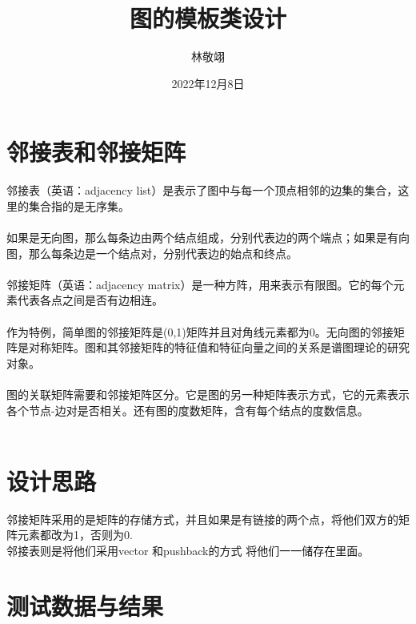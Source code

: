 \documentclass{article}
\title{图的模板类设计}
\author{林敬翊}
\date{2022年12月8日}
\begin{document}
\maketitle

\section{邻接表和邻接矩阵}
邻接表（英语：adjacency list）是表示了图中与每一个顶点相邻的边集的集合，这里的集合指的是无序集。\\
~\\
如果是无向图，那么每条边由两个结点组成，分别代表边的两个端点；如果是有向图，那么每条边是一个结点对，分别代表边的始点和终点。\\
~\\
\hspace*{0.7cm}邻接矩阵（英语：adjacency matrix）是一种方阵，用来表示有限图。它的每个元素代表各点之间是否有边相连。\\
~\\
作为特例，简单图的邻接矩阵是(0,1)矩阵并且对角线元素都为0。无向图的邻接矩阵是对称矩阵。图和其邻接矩阵的特征值和特征向量之间的关系是谱图理论的研究对象。\\
~\\
图的关联矩阵需要和邻接矩阵区分。它是图的另一种矩阵表示方式，它的元素表示各个节点-边对是否相关。还有图的度数矩阵，含有每个结点的度数信息。\\
~\\

\section{设计思路}
邻接矩阵采用的是矩阵的存储方式，并且如果是有链接的两个点，将他们双方的矩阵元素都改为1，否则为0.\\

邻接表则是将他们采用vector 和pushback的方式 将他们一一储存在里面。

\section{测试数据与结果}
\end{document}
